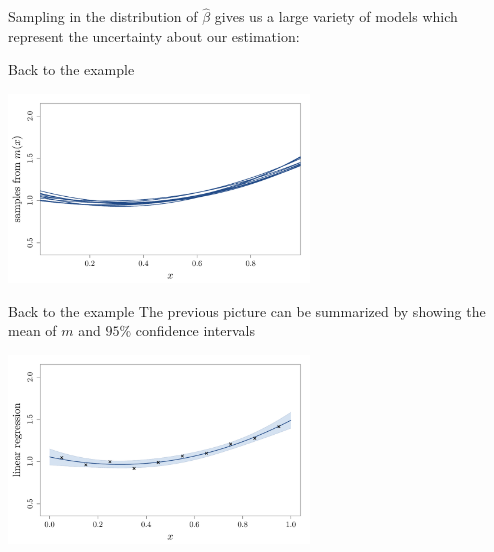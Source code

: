 \documentclass{beamer}
\begin{document}
\begin{frame}{}
Sampling in the distribution of $\hat{\beta}$ gives us a large variety of models which represent the uncertainty about our estimation:
\begin{exampleblock}{Back to the example}
\begin{center}
  \includegraphics[height=5cm]{figures/R/linreg_4}
\end{center}
\end{exampleblock}
\end{frame}

\begin{frame}{}
\begin{exampleblock}{Back to the example}
The previous picture can be summarized by showing the mean of $m$ and $95\%$ confidence intervals
\begin{center}
  \includegraphics[height=5cm]{figures/R/linreg_5}
\end{center}
\end{exampleblock}
\end{frame}
\end{document}
